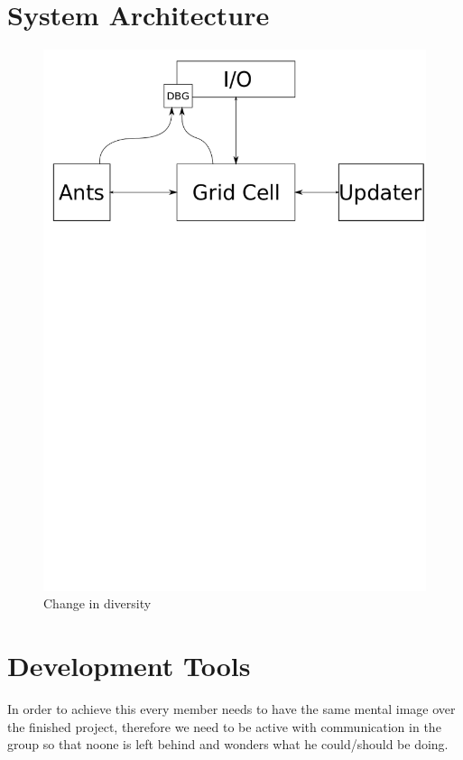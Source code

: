 \documentclass[a4paper]{article}
\begin{document}
\section{System Architecture}

\begin{figure}[h!]
\centerline{
\includegraphics[scale=0.5]{images/architecture.png}
}
\caption{Change in diversity} 
\end{figure}

\section{Development Tools}
In order to achieve this every member needs to have the same mental image over
the finished project, therefore we need to be active with communication in the
group so that noone is left behind and wonders what he could/should be doing.
\end{document}
